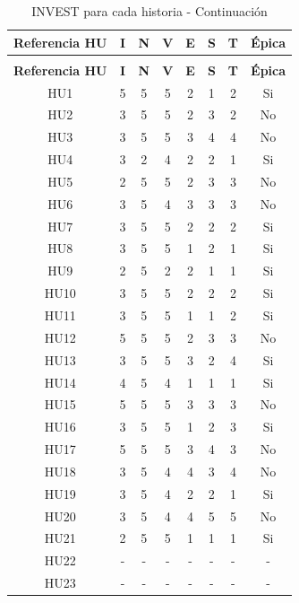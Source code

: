 \begin{longtable} {|c|c|c|c|c|c|c|c|}
\caption{INVEST para cada historia}
\label{table:invest} \\
\hline
\textbf{Referencia HU} & \textbf{I} & \textbf{N} & \textbf{V} & \textbf{E} & \textbf{S} & \textbf{T} & \textbf{Épica} \\
\hline
\endfirsthead

\caption{INVEST para cada historia - Continuación}\\
\hline
\textbf{Referencia HU} & \textbf{I} & \textbf{N} & \textbf{V} & \textbf{E} & \textbf{S} & \textbf{T} & \textbf{Épica} \\
\hline
\endhead

HU1 & 5 & 5 & 5 & 2 & 1 & 2 & Si \\
\hline
HU2 & 3 & 5 & 5 & 2 & 3 & 2 & No \\
\hline
HU3 & 3 & 5 & 5 & 3 & 4 & 4 & No \\
\hline
HU4 & 3 & 2 & 4 & 2 & 2 & 1 & Si \\
\hline
HU5 & 2 & 5 & 5 & 2 & 3 & 3 & No \\
\hline
HU6 & 3 & 5 & 4 & 3 & 3 & 3 & No \\
\hline
HU7 & 3 & 5 & 5 & 2 & 2 & 2 & Si \\
\hline
HU8 & 3 & 5 & 5 & 1 & 2 & 1 & Si \\
\hline
HU9 & 2 & 5 & 2 & 2 & 1 & 1 & Si \\
\hline
HU10 & 3 & 5 & 5 & 2 & 2 & 2 & Si \\
\hline
HU11 & 3 & 5 & 5 & 1 & 1 & 2 & Si \\
\hline
HU12 & 5 & 5 & 5 & 2 & 3 & 3 & No \\
\hline
HU13 & 3 & 5 & 5 & 3 & 2 & 4 & Si \\
\hline
HU14 & 4 & 5 & 4 & 1 & 1 & 1 & Si \\
\hline
HU15 & 5 & 5 & 5 & 3 & 3 & 3 & No \\
\hline
HU16 & 3 & 5 & 5 & 1 & 2 & 3 & Si \\
\hline
HU17 & 5 & 5 & 5 & 3 & 4 & 3 & No \\
\hline
HU18 & 3 & 5 & 4 & 4 & 3 & 4 & No \\
\hline
HU19 & 3 & 5 & 4 & 2 & 2 & 1 & Si \\
\hline
HU20 & 3 & 5 & 4 & 4 & 5 & 5 & No \\
\hline
HU21 & 2 & 5 & 5 & 1 & 1 & 1 & Si \\
\hline
HU22 & - & - & - & - & - & - & - \\
\hline
HU23 & - & - & - & - & - & - & - \\
\hline
\end{longtable}

